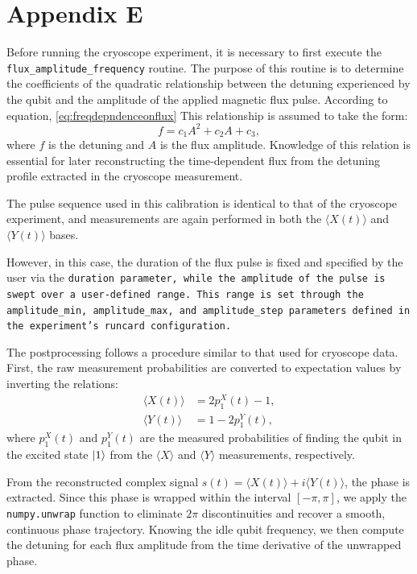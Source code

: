 \chapter*{Appendix E}
\label{app:AppendixE}

Before running the cryoscope experiment, it is necessary to first execute the \texttt{flux\_amplitude\_frequency} routine. 
The purpose of this routine is to determine the coefficients of the quadratic relationship between the detuning experienced by the qubit and the amplitude of the applied magnetic flux pulse. 
According to equation, \ref{eq:freqdepndenceonflux} This relationship is assumed to take the form:
\begin{equation}
f = c_1 A^2 + c_2 A + c_3,
\label{eq:freqdepndenceonflux}
\end{equation}
where $f$ is the detuning and $A$ is the flux amplitude. 
Knowledge of this relation is essential for later reconstructing the time-dependent flux from the detuning profile extracted in the cryoscope measurement.

The pulse sequence used in this calibration is identical to that of the cryoscope experiment, and measurements are again performed in both the $\langle X(t) \rangle$ and $\langle Y(t) \rangle$ bases. 

However, in this case, the duration of the flux pulse is fixed and specified by the user via the \tt{duration} parameter, while the amplitude of the pulse is swept over a user-defined range. 
This range is set through the \tt{amplitude\_min}, \tt{amplitude\_max}, and \tt{amplitude\_step} parameters defined in the experiment's runcard configuration.

The postprocessing follows a procedure similar to that used for cryoscope data. 
First, the raw measurement probabilities are converted to expectation values by inverting the relations:
\begin{align}
\langle X(t) \rangle &= 2p^X_1(t) - 1, \\
\langle Y(t) \rangle &= 1 - 2p^Y_1(t),
\end{align}
where $p^X_1(t)$ and $p^Y_1(t)$ are the measured probabilities of finding the qubit in the excited state $\ket{1}$ from the $\langle X \rangle$ and $\langle Y \rangle$ measurements, respectively.

From the reconstructed complex signal $s(t) = \langle X(t) \rangle + i\langle Y(t) \rangle$, the phase is extracted. 
Since this phase is wrapped within the interval $[-\pi, \pi]$, we apply the \texttt{numpy.unwrap} function to eliminate $2\pi$ discontinuities and recover a smooth, continuous phase trajectory. 
Knowing the idle qubit frequency, we then compute the detuning for each flux amplitude from the time derivative of the unwrapped phase.

